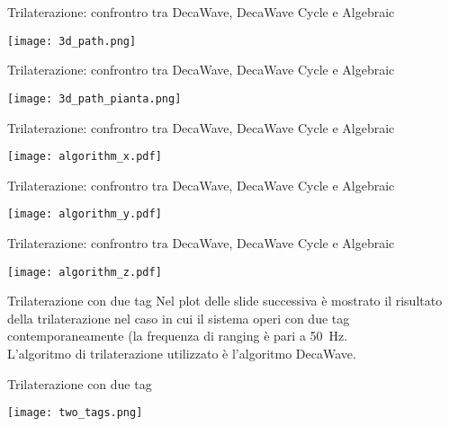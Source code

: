 \begin{frame}{Trilaterazione: confrontro tra DecaWave, DecaWave Cycle e Algebraic}
  \begin{center}
    \texttt{[image: 3d\_path.png]}
  \end{center}
\end{frame}

\begin{frame}{Trilaterazione: confrontro tra DecaWave, DecaWave Cycle e Algebraic}
  \begin{center}
    \texttt{[image: 3d\_path\_pianta.png]}
  \end{center}
\end{frame}

\begin{frame}{Trilaterazione: confrontro tra DecaWave, DecaWave Cycle e Algebraic}
  \begin{center}
    \texttt{[image: algorithm\_x.pdf]}
  \end{center}
\end{frame}

\begin{frame}{Trilaterazione: confrontro tra DecaWave, DecaWave Cycle e Algebraic}
  \begin{center}
    \texttt{[image: algorithm\_y.pdf]}
  \end{center}
\end{frame}

\begin{frame}{Trilaterazione: confrontro tra DecaWave, DecaWave Cycle e Algebraic}
  \begin{center}
    \texttt{[image: algorithm\_z.pdf]}
  \end{center}
\end{frame}

\begin{frame}{Trilaterazione con due tag}
  Nel plot delle slide successiva è mostrato il risultato della trilaterazione nel caso in cui il sistema
  operi con due tag contemporaneamente (la frequenza di ranging è pari a \SI{50}{\hertz}.\\
  L'algoritmo di trilaterazione utilizzato è l'algoritmo DecaWave.
\end{frame}

\begin{frame}{Trilaterazione con due tag}
  \begin{center}
    \texttt{[image: two\_tags.png]}
  \end{center}
\end{frame}

